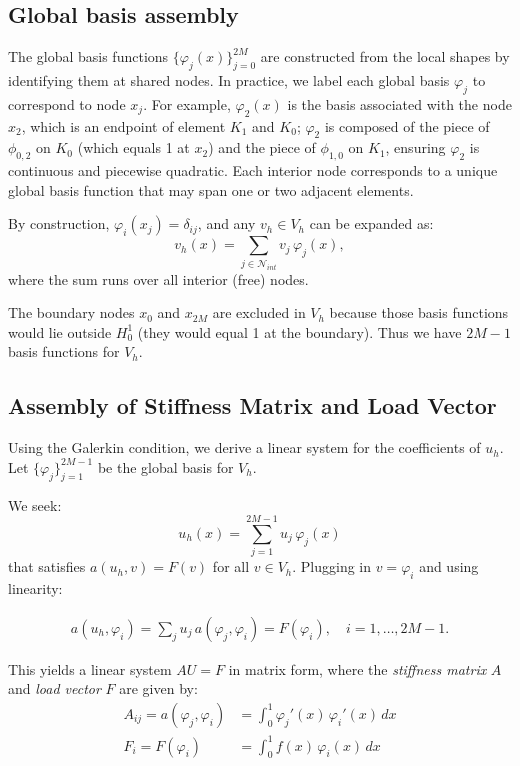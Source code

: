 \documentclass[a4paper,10pt]{article}
\begin{document}
\subsection*{Global basis assembly}
The global basis functions \(\{\varphi_j(x)\}_{j=0}^{2M}\) are constructed from the local shapes by identifying them at shared nodes.
In practice, we label each global basis \(\varphi_j\) to correspond to node \(x_j\).
For example, \(\varphi_2(x)\) is the basis associated with the node \(x_2\), which is an endpoint of element \(K_1\) and \(K_0\);
\(\varphi_2\) is composed of the piece of \(\phi_{0,2}\) on \(K_0\) (which equals 1 at \(x_2\)) and the piece of \(\phi_{1,0}\) on \(K_1\), ensuring \(\varphi_2\) is continuous and piecewise quadratic.
Each interior node corresponds to a unique global basis function that may span one or two adjacent elements.

By construction, \(\varphi_i(x_j) = \delta_{ij}\), and any \(v_h \in V_h\) can be expanded as:
\[
	v_h(x) = \sum_{j \in \mathcal{N}_{int}} v_j\, \varphi_j(x),
\]
where the sum runs over all interior (free) nodes.

The boundary nodes \(x_0\) and \(x_{2M}\) are excluded in \(V_h\) because those basis functions would lie outside \(H^1_0\) (they would equal 1 at the boundary).
Thus we have \(2M-1\) basis functions for \(V_h\).

\subsection*{Assembly of Stiffness Matrix and Load Vector}
Using the Galerkin condition, we derive a linear system for the coefficients of \(u_h\).
Let \(\{ \varphi_j \}_{j=1}^{2M-1} \) be the global basis for \(V_h\).

We seek:
\[
	u_h(x) = \sum_{j=1}^{2M-1} u_j\, \varphi_j(x)
\]
that satisfies \(a(u_h,v) = F(v)\) for all \(v \in V_h\).
Plugging in \(v = \varphi_i\) and using linearity:

\begin{align*}
	a(u_h,\varphi_i) = \sum_{j} u_j\, a(\varphi_j,\varphi_i) = F(\varphi_i), \quad i=1,\dots,2M-1.
\end{align*}

This yields a linear system \(AU = F\) in matrix form, where the \emph{stiffness matrix} \(A\) and \emph{load vector} \(F\) are given by:
\begin{align*}
	A_{ij}  = a(\varphi_j,\varphi_i) & = \int_0^1 \varphi_j'(x)\,\varphi_i'(x)\,dx \\
	F_i     = F(\varphi_i)           & = \int_0^1 f(x)\,\varphi_i(x)\,dx
\end{align*}
\end{document}
